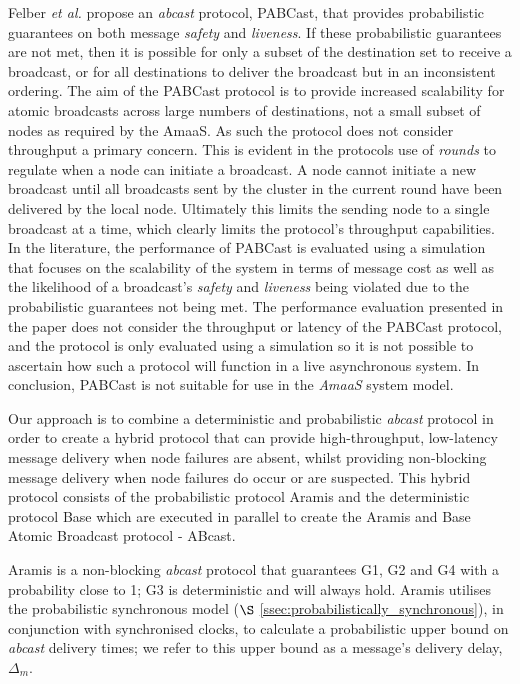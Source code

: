     Felber \emph{et al.} \citep{Felber01probabilisticatomic} propose an \emph{abcast} protocol, \textsf{PABCast}, that provides probabilistic guarantees on both message \emph{safety} and \emph{liveness}.  If these probabilistic guarantees are not met, then it is possible for only a subset of the destination set to receive a broadcast, or for all destinations to deliver the broadcast but in an inconsistent ordering.  The aim of the  \textsf{PABCast} protocol is to provide increased scalability for atomic broadcasts across large numbers of destinations, not a small subset of nodes as required by the \textsf{AmaaS}.  As such the protocol does not consider throughput a primary concern.  This is evident in the protocols use of \emph{rounds} to regulate when a node can initiate a broadcast.  A node cannot initiate a new broadcast until all broadcasts sent by the cluster in the current round have been delivered by the local node.  Ultimately this limits the sending node to a single broadcast at a time, which clearly limits the protocol's throughput capabilities.  In the literature, the performance of \textsf{PABCast} is evaluated using a simulation that focuses on the scalability of the system in terms of message cost as well as the likelihood of a broadcast's \emph{safety} and \emph{liveness} being violated due to the probabilistic guarantees not being met. The performance evaluation presented in the paper does not consider the throughput or latency of the \textsf{PABCast} protocol, and the protocol is only evaluated using a simulation so it is not possible to ascertain how such a protocol will function in a live asynchronous system.  In conclusion, \textsf{PABCast} is not suitable for use in the \emph{AmaaS} system model.  
    
    Our approach is to combine a deterministic and probabilistic \emph{abcast} protocol in order to create a hybrid protocol that can provide high-throughput, low-latency message delivery when node failures are absent, whilst providing non-blocking message delivery when node failures do occur or are suspected.  This hybrid protocol consists of the probabilistic protocol \textsf{Aramis} and the deterministic protocol \textsf{Base} which are executed in parallel to create the \textsf{Aramis} and \textsf{Base} Atomic Broadcast protocol - \textsf{ABcast}.  
    
    \textsf{Aramis} is a non-blocking \emph{abcast} protocol that guarantees G1, G2 and G4 with a probability close to 1; G3 is deterministic and will always hold.  \textsf{Aramis} utilises the probabilistic synchronous model ($\S$ \ref{ssec:probabilistically_synchronous}), in conjunction with synchronised clocks, to calculate a probabilistic upper bound on \emph{abcast} delivery times; we refer to this upper bound as a message's delivery delay, $\Delta_m$.  
    
